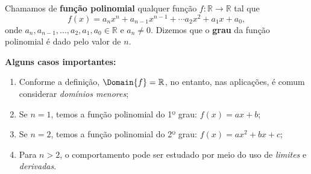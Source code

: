 \begin{frame}
  \begin{definition}
    Chamamos de \textbf{função polinomial} qualquer função $f:\mathbb{R}\rightarrow\mathbb{R}$ tal que
    \begin{equation*}
      f(x) = a_{n}x^{n} + a_{n-1}x^{n-1} + \cdots a_{2}x^{2} + a_{1}x + a_{0},
    \end{equation*}
    onde $a_{n},a_{n-1},\dots,a_{2},a_{1},a_{0}\in\mathbb{R}$ e $a_{n}\not=0$. Dizemos que o \textbf{grau} da função polinomial é dado pelo valor de $n$.
  \end{definition}
  \begin{highlight}
    \textbf{Alguns casos importantes:}
    \begin{enumerate}
      \item Conforme a definição, $\Domain{f}=\mathbb{R}$, no entanto, nas aplicações, é comum considerar \emph{domínios menores};
      \item Se $n=1$, temos a função polinomial do 1º grau: $f(x) = ax + b$;
      \item Se $n=2$, temos a função polinomial do 2º grau: $f(x) = ax^{2} + bx + c$;
      \item Para $n > 2$, o comportamento pode ser estudado por meio do
      uso de \emph{limites} e \emph{derivadas}.
    \end{enumerate}
  \end{highlight}
\end{frame}

